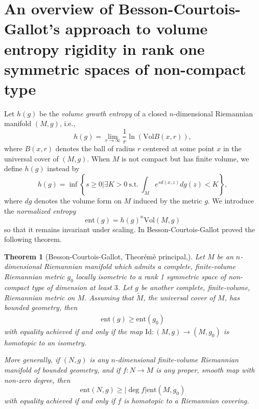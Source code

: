 \documentclass{article}
\newcommand{\vol}{\mathrm{Vol}}
\newcommand{\id}{\mathrm{Id}}
\newtheorem{thm}{Theorem}[section]
\theoremstyle{definition}
\begin{document}
\section{An overview of Besson-Courtois-Gallot's approach to volume entropy rigidity in rank one symmetric spaces of non-compact type}\label{s2}
\iffalse Let $h(g)$ be the \emph{volume growth entropy} of a closed $n$-dimensional Riemannian manifold $(M,g)$, i.e.,
$$h(g)=\lim_{r\to \infty}\frac{1}{r}\ln(\vol B(x,r)),$$
where $B(x,r)$ denotes the ball of radius $r$ centered at some point $x$ in the universal cover of $(M,g)$. When $M$ is not compact but has finite volume, we define $h(g)$ instead by
$$h(g)=\inf\left\{\left. s\geq 0\right|\exists K>0\mathrm{~s.t.~}\int_Me^{s d(x,z)}dg(z)<K\right\},$$ 
where $dg$ denotes the volume form on $M$ induced by the metric $g$. We introduce the \emph{normalized entropy} 
$$\mathrm{ent}(g)=h(g)^n\vol(M,g)$$
so that it remains invariant under scaling. In \cite{BCG1} Besson-Courtois-Gallot proved the following theorem.
\begin{thm}[Besson-Courtois-Gallot, Theor\'em\`e principal,\cite{BCG1}]

Let $M$ be an $n$-dimensional Riemannian manifold which admits a complete, finite-volume Riemannian metric $g_0$ locally isometric to a rank 1 symmetric space of non-compact type of dimension at least $3$. Let $g$ be another complete, finite-volume, Riemannian metric on $M$. Assuming that $\widetilde M$, the universal cover of $M$, has bounded geometry, then
\begin{align}\label{ent_rigid_ineq}
\mathrm{ent}(g)\geq\mathrm{ent}(g_0)
\end{align}
with equality achieved if and only if the map $\id:(M,g)\to (M,g_0)$ is homotopic to an isometry.

More generally, if $(N,g)$ is any $n$-dimensional finite-volume Riemannian manifold of bounded geometry, and if $f:N\to M$ is any proper,  smooth map with non-zero degree,  then
$$\mathrm{ent}(N,g)\geq|\deg f|\mathrm{ent}(M,g_0)$$
with equality achieved if and only if $f$ is homotopic to a Riemannian covering.
\end{thm}
\end{document}
